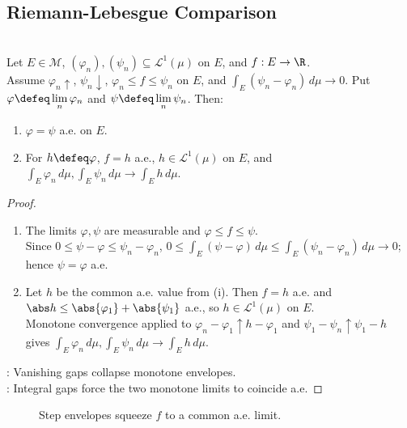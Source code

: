 \subsection{Riemann-Lebesgue Comparison}

\begin{lemma} \label{lem:monotone-integrable-squeeze} \\
Let $E\in\mathcal{M}$, $(\varphi_n),(\psi_n)\subseteq\mathscr{L}^1(\mu)$ on $E$, and $f:E\to\R$.\\
Assume $\varphi_n\uparrow$, $\psi_n\downarrow$, $\varphi_n\leq f\leq\psi_n$ on $E$, and $\int_E(\psi_n-\varphi_n)\,d\mu\to0$. Put $\varphi\defeq\lim\limits_n\varphi_n$ and $\psi\defeq\lim\limits_n\psi_n$. Then:
\begin{enumerate}[label=(\roman*)]
\setlength{\itemsep}{0pt}
\item $\varphi=\psi$ a.e. on $E$.
\item For $h\defeq\varphi$, $f=h$ a.e., $h\in\mathscr{L}^1(\mu)$ on $E$, and $\int_E\varphi_n\,d\mu,\int_E\psi_n\,d\mu\to\int_Eh\,d\mu$.
\end{enumerate}
\begin{proof}
\begin{enumerate}[label=(\roman*)]
\setlength{\itemsep}{0pt}
\item The limits $\varphi,\psi$ are measurable and $\varphi\leq f\leq\psi$.\\
Since $0\leq\psi-\varphi\leq\psi_n-\varphi_n$, $0\leq\int_E(\psi-\varphi)\,d\mu\leq\int_E(\psi_n-\varphi_n)\,d\mu\to0$; hence $\psi=\varphi$ a.e.
\item Let $h$ be the common a.e. value from (i). Then $f=h$ a.e. and $\abs h\leq\abs{\varphi_1}+\abs{\psi_1}$ a.e., so $h\in\mathscr{L}^1(\mu)$ on $E$.\\
Monotone convergence applied to $\varphi_n-\varphi_1\uparrow h-\varphi_1$ and $\psi_1-\psi_n\uparrow\psi_1-h$ gives $\int_E\varphi_n\,d\mu,\int_E\psi_n\,d\mu\to\int_Eh\,d\mu$.
\end{enumerate}
: Vanishing gaps collapse monotone envelopes.\\
: Integral gaps force the two monotone limits to coincide a.e.
\end{proof}
\end{lemma}

\begin{figure}[H]
  \centering
  
  \caption{Step envelopes squeeze $f$ to a common a.e. limit.}
  \label{fig:lebesgue-step-squeeze}
\end{figure}

